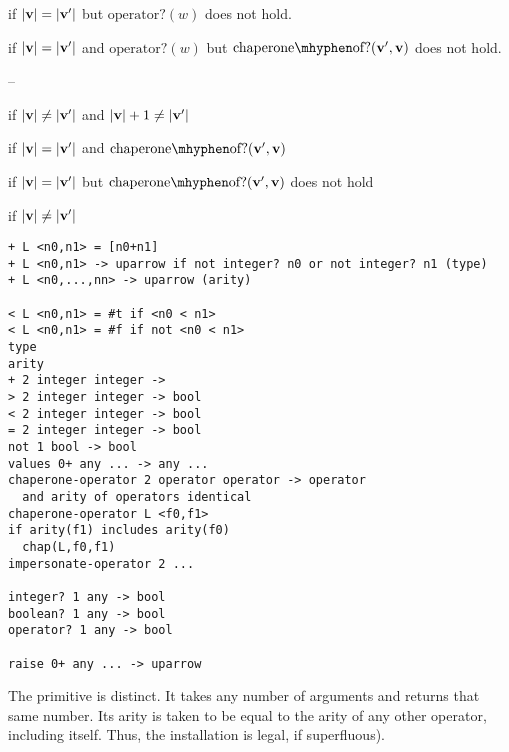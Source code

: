 \documentclass{sigplanconf}
\begin{document}
if $|\mathbf{v}|=|\mathbf{v'}|$ but $\mathrm{operator?}(w)$ does not hold.

if $|\mathbf{v}|=|\mathbf{v'}|$ and $\mathrm{operator?}(w)$ but $\mathrm{chaperone\mhyphen of?}(\vvp,\vv)$ does not hold.

--

if $|\mathbf{v}|\ne|\mathbf{v'}|$ and $|\mathbf{v}|+1\ne|\mathbf{v'}|$







\red{\sval{\chacrk{\vv}::\ks}{\sigma}{\vvp}}{\sval{\ks}{\sigma}{\vvp}}
if $|\mathbf{v}|=|\mathbf{v'}|$ and $\mathrm{chaperone\mhyphen of?}(\vvp,\vv)$

if $|\mathbf{v}|=|\mathbf{v'}|$ but $\mathrm{chaperone\mhyphen of?}(\vvp,\vv)$ does not hold

if $|\mathbf{v}|\ne|\mathbf{v'}|$

\begin{verbatim}
+ L <n0,n1> = [n0+n1]
+ L <n0,n1> -> uparrow if not integer? n0 or not integer? n1 (type)
+ L <n0,...,nn> -> uparrow (arity)

< L <n0,n1> = #t if <n0 < n1>
< L <n0,n1> = #f if not <n0 < n1>
type
arity
+ 2 integer integer ->
> 2 integer integer -> bool
< 2 integer integer -> bool
= 2 integer integer -> bool
not 1 bool -> bool
values 0+ any ... -> any ...
chaperone-operator 2 operator operator -> operator
  and arity of operators identical
chaperone-operator L <f0,f1>
if arity(f1) includes arity(f0)
  chap(L,f0,f1)
impersonate-operator 2 ...

integer? 1 any -> bool
boolean? 1 any -> bool
operator? 1 any -> bool

raise 0+ any ... -> uparrow
\end{verbatim}

The  primitive is distinct.
It takes any number of arguments and returns that same number.
Its arity is taken to be equal to the arity of any other operator, including itself.
Thus, the installation  is legal, if superfluous).
\end{document}
